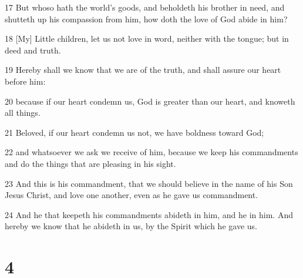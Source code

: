 \par 17 But whoso hath the world's goods, and beholdeth his brother in need, and shutteth up his compassion from him, how doth the love of God abide in him?
\par 18 [My] Little children, let us not love in word, neither with the tongue; but in deed and truth.
\par 19 Hereby shall we know that we are of the truth, and shall assure our heart before him:
\par 20 because if our heart condemn us, God is greater than our heart, and knoweth all things.
\par 21 Beloved, if our heart condemn us not, we have boldness toward God;
\par 22 and whatsoever we ask we receive of him, because we keep his commandments and do the things that are pleasing in his sight.
\par 23 And this is his commandment, that we should believe in the name of his Son Jesus Christ, and love one another, even as he gave us commandment.
\par 24 And he that keepeth his commandments abideth in him, and he in him. And hereby we know that he abideth in us, by the Spirit which he gave us.

\chapter{4}

